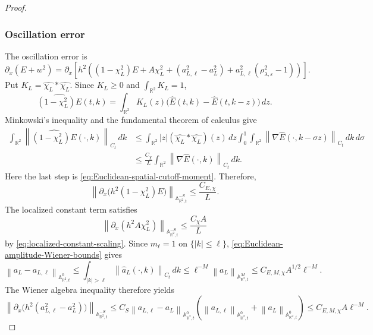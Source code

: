 \documentclass[12pt,reqno,letterpaper]{amsart}
\numberwithin{equation}{section}
\theoremstyle{definition}
\newcommand{\R}{\mathbb R}
\newcommand{\A}{\mathbb A}
\newcommand{\eps}{\varepsilon}
\newcommand{\la}{\lambda}
\newcommand{\norm}[1]{\left\lVert #1\right\rVert}
\newcommand{\abs}[1]{\left\lvert #1\right\rvert}
\begin{document}
\begin{proof}
\subsubsection*{Oscillation error}

The oscillation error is
\[
 \partial_x(E+w^2)
 =\partial_x\left[h^2\left((1-\chi_L^2)E+A\chi_L^2
 +(a_{L,\ell}^2-a_L^2)
 +a_{L,\ell}^2(\rho_{\la,\eps}^2-1)\right)\right].
\]
Put
$K_L=\widehat{\chi_L}*\widehat{\chi_L}$.  Since
$K_L\geq0$ and $\int_{\R^2}K_L=1$,
\[
 \widehat{(1-\chi_L^2)E}(t,k)
 =\int_{\R^2}K_L(z)
   \bigl(\widehat E(t,k)-\widehat E(t,k-z)\bigr)\,dz.
\]
Minkowski's inequality and the fundamental theorem of calculus give
\begin{align*}
 \int_{\R^2}
 \norm{\widehat{(1-\chi_L^2)E}(\cdot,k)}_{C_t}\,dk
 &\leq\int_{\R^2}\abs z
 (\widehat{\chi_L}*\widehat{\chi_L})(z)\,dz
 \int_0^1\int_{\R^2}
 \norm{\nabla\widehat E(\cdot,k-\sigma z)}_{C_t}\,dk\,d\sigma\\
 &\leq\frac{C_\chi}{L}
 \int_{\R^2}\norm{\nabla\widehat E(\cdot,k)}_{C_t}\,dk.
\end{align*}
Here the last step is \eqref{eq:Euclidean-spatial-cutoff-moment}.
Therefore,
\begin{equation*}
 \norm{\partial_x\bigl(h^2(1-\chi_L^2)E\bigr)}
      _{\A^{-S}_{\R^2,t}}
 \leq\frac{C_{E,\chi}}{L}.
\end{equation*}
The localized constant term satisfies
\begin{equation*}
 \norm{\partial_x(h^2A\chi_L^2)}_{\A^{-S}_{\R^2,t}}
 \leq\frac{C_\chi A}{L}
\end{equation*}
by \eqref{eq:localized-constant-scaling}.  Since $m_\ell=1$ on
$\{\abs k\leq\ell\}$, \eqref{eq:Euclidean-amplitude-Wiener-bounds}
gives
\[
 \norm{a_L-a_{L,\ell}}_{\A^0_{\R^2,t}}
 \leq\int_{\abs k>\ell}\norm{\widehat a_L(\cdot,k)}_{C_t}\,dk
 \leq\ell^{-M}\norm{a_L}_{\A^M_{\R^2,t}}
 \leq C_{E,M,\chi}A^{1/2}\ell^{-M}.
\]
The Wiener algebra inequality therefore yields
\begin{equation*}
 \norm{\partial_x\bigl(h^2(a_{L,\ell}^2-a_L^2)\bigr)}
      _{\A^{-S}_{\R^2,t}}
 \leq C_S\norm{a_{L,\ell}-a_L}_{\A^0_{\R^2,t}}
 \left(\norm{a_{L,\ell}}_{\A^0_{\R^2,t}}
       +\norm{a_L}_{\A^0_{\R^2,t}}\right)
 \leq C_{E,M,\chi}A\ell^{-M}.
\end{equation*}


\end{proof}
\end{document}
